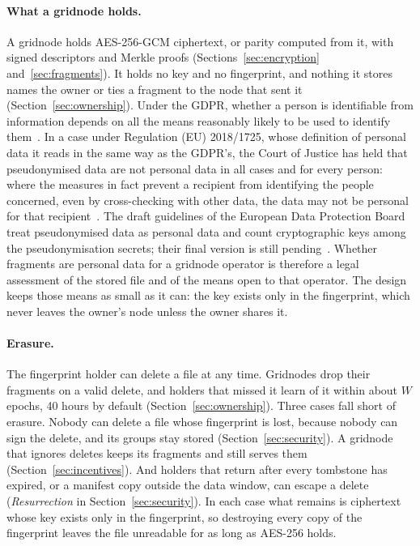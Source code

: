 \documentclass[10pt,a4paper,final]{article}
\begin{document}
\paragraph{What a gridnode holds.} A gridnode holds AES-256-GCM ciphertext, or parity computed from it, with signed
descriptors and Merkle proofs (Sections~\ref{sec:encryption} and~\ref{sec:fragments}). It holds no key and no
fingerprint, and nothing it stores names the owner or ties a fragment to the node that sent it
(Section~\ref{sec:ownership}). Under the GDPR, whether a person is identifiable from information depends on all the
means reasonably likely to be used to identify them~\cite{gdpr2016}. In a case under Regulation (EU) 2018/1725,
whose definition of personal data it reads in the same way as the GDPR's, the Court of Justice has held that
pseudonymised data are not personal data in all cases and for every person: where the measures in fact prevent a
recipient from identifying the people concerned, even by cross-checking with other data, the data may not be
personal for that recipient~\cite{cjeu2025srb}. The draft guidelines of the European Data Protection Board treat
pseudonymised data as personal data and count cryptographic keys among the pseudonymisation secrets; their final
version is still pending~\cite{edpb2025pseudo}. Whether
fragments are personal data for a gridnode operator is therefore a legal assessment of the stored file and of the
means open to that operator. The design keeps those means as small as it can: the key exists only in the
fingerprint, which never leaves the owner's node unless the owner shares it.

\paragraph{Erasure.} The fingerprint holder can delete a file at any time. Gridnodes drop their fragments on a valid
delete, and holders that missed it learn of it within about $W$ epochs, 40 hours by default
(Section~\ref{sec:ownership}). Three cases fall short of erasure. Nobody can delete a file whose fingerprint is
lost, because nobody can sign the delete, and its groups stay stored (Section~\ref{sec:security}). A gridnode that
ignores deletes keeps its fragments and still serves them (Section~\ref{sec:incentives}). And holders that return
after every tombstone has expired, or a manifest copy outside the data window, can escape a delete
(\emph{Resurrection} in Section~\ref{sec:security}). In each case what remains
is ciphertext whose key exists only in the fingerprint, so destroying every copy of the fingerprint leaves the file
unreadable for as long as AES-256 holds.
\end{document}
